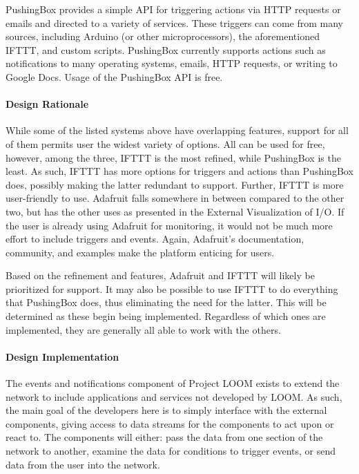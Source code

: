 \documentclass[onecolumn, draftclsnofoot,10pt, compsoc]{IEEEtran}
\begin{document}
    PushingBox provides a simple API for triggering actions via HTTP requests or emails and directed to a variety of services. These triggers can come from many sources, including Arduino (or other microprocessors), the aforementioned IFTTT, and custom scripts. PushingBox currently supports actions such as notifications to many operating systems, emails, HTTP requests, or writing to Google Docs. Usage of the PushingBox API is free. \cite{pushingbox}

\paragraph{Design Rationale}
    While some of the listed systems above have overlapping features, support for all of them permits user the widest variety of options. All can be used for free, however, among the three, IFTTT is the most refined, while PushingBox is the least. As such, IFTTT has more options for triggers and actions than PushingBox does, possibly making the latter redundant to support. Further, IFTTT is more user-friendly to use. Adafruit falls somewhere in between compared to the other two, but has the other uses as presented in the External Visualization of I/O. If the user is already using Adafruit for monitoring, it would not be much more effort to include triggers and events. Again, Adafruit's documentation, community, and examples make the platform enticing for users.

    Based on the refinement and features, Adafruit and IFTTT will likely be prioritized for support. It may also be possible to use IFTTT to do everything that PushingBox does, thus eliminating the need for the latter. This will be determined as these begin being implemented. Regardless of which ones are implemented, they are generally all able to work with the others.

\paragraph{Design Implementation}
    The events and notifications component of Project LOOM exists to extend the network to include applications and services not developed by LOOM. As such, the main goal of the developers here is to simply interface with the external components, giving access to data streams for the components to act upon or react to. The components will either: pass the data from one section of the network to another, examine the data for conditions to trigger events, or send data from the user into the network.
\end{document}
